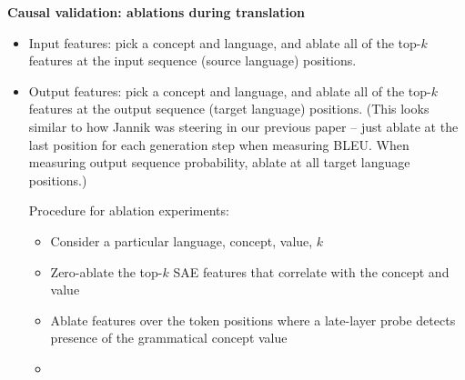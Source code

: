 \documentclass[11pt]{article}
\begin{document}
\textbf{Causal validation: ablations during translation}
\begin{itemize}
    \item Input features: pick a concept and language, and ablate all of the top-$k$ features at the input sequence (source language) positions.
    \item Output features: pick a concept and language, and ablate all of the top-$k$ features at the output sequence (target language) positions. (This looks similar to how Jannik was steering in our previous paper -- just ablate at the last position for each generation step when measuring BLEU. When measuring output sequence probability, ablate at all target language positions.)






Procedure for ablation experiments:
\begin{itemize}
    \item Consider a particular language, concept, value, $k$
    \item Zero-ablate the top-$k$ SAE features that correlate with the concept and value
    \item Ablate features over the token positions where a late-layer probe detects presence of the grammatical concept value
    \item 
\end{itemize}







\end{itemize}
\end{document}
